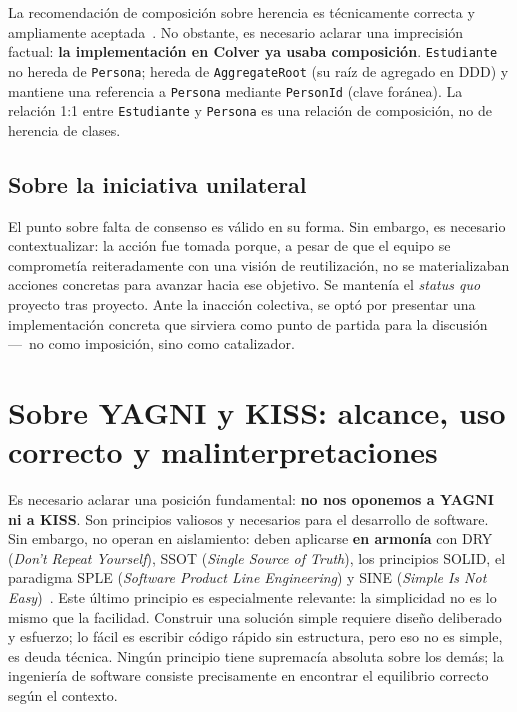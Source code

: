 \documentclass[conference]{IEEEtran}
\begin{document}
La recomendaci\'on de composici\'on sobre herencia es
t\'ecnicamente correcta y ampliamente aceptada~\cite{gof1994}.
No obstante, es necesario aclarar una imprecisi\'on factual:
\textbf{la implementaci\'on en Colver ya usaba composici\'on}.
\texttt{Estudiante} no hereda de \texttt{Persona}; hereda de
\texttt{AggregateRoot} (su ra\'iz de agregado en DDD) y mantiene
una referencia a \texttt{Persona} mediante \texttt{PersonId}
(clave for\'anea). La relaci\'on 1:1 entre \texttt{Estudiante} y
\texttt{Persona} es una relaci\'on de composici\'on, no de
herencia de clases.

\subsection{Sobre la iniciativa unilateral}

El punto sobre falta de consenso es v\'alido en su forma.
Sin embargo, es necesario contextualizar: la acci\'on fue tomada
porque, a pesar de que el equipo se compromet\'ia reiteradamente
con una visi\'on de reutilizaci\'on, no se materializaban acciones
concretas para avanzar hacia ese objetivo. Se manten\'ia el
\textit{status quo} proyecto tras proyecto. Ante la inacci\'on
colectiva, se opt\'o por presentar una implementaci\'on concreta
que sirviera como punto de partida para la discusi\'on ---~no
como imposici\'on, sino como catalizador.

\section{Sobre YAGNI y KISS: alcance, uso correcto y malinterpretaciones}
\label{sec:yagni}

Es necesario aclarar una posici\'on fundamental: \textbf{no nos
oponemos a YAGNI ni a KISS}. Son principios valiosos y necesarios
para el desarrollo de software. Sin embargo, no operan en
aislamiento: deben aplicarse \textbf{en armon\'ia} con DRY
(\textit{Don't Repeat Yourself}), SSOT (\textit{Single Source of
Truth}), los principios SOLID, el paradigma SPLE
(\textit{Software Product Line Engineering}) y SINE
(\textit{Simple Is Not Easy})~\cite{sine}. Este \'ultimo principio
es especialmente relevante: la simplicidad no es lo mismo que la
facilidad. Construir una soluci\'on simple requiere dise\~no
deliberado y esfuerzo; lo f\'acil es escribir c\'odigo r\'apido
sin estructura, pero eso no es simple, es deuda t\'ecnica.
Ning\'un principio tiene supremac\'ia absoluta sobre los dem\'as;
la ingenier\'ia de software consiste precisamente en encontrar el
equilibrio correcto seg\'un el contexto.
\end{document}
